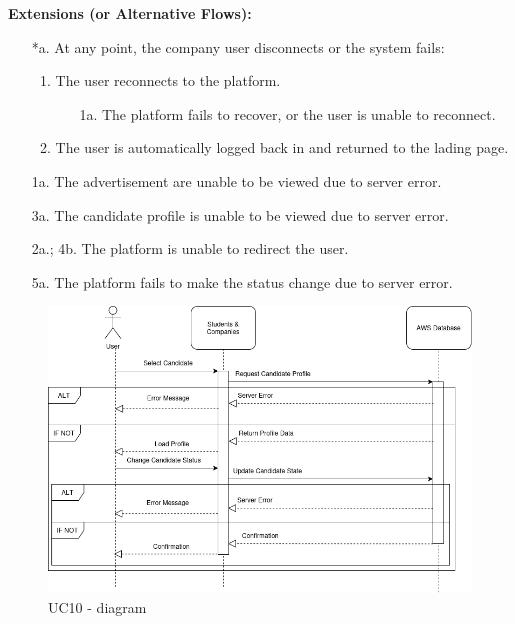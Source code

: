\begin{itemize}[label={[\textbf{UC}]}, align=left, leftmargin=*]
    \textbf{Extensions (or Alternative Flows):} 
    \begin{enumerate}[label=\arabic*.]
        \item[*a.] At any point, the company user disconnects or the system fails:
            \begin{enumerate}[label=\arabic*.]
                \item The user reconnects to the platform.
                    \begin{enumerate}[label=\alph*.]
                        \item[1a.] The platform fails to recover, or the user is unable to reconnect.
                    \end{enumerate}
                 \item The user is automatically logged back in and returned to the lading page.
            \end{enumerate}
        \item[1a.] The advertisement are unable to be viewed due to server error. 
        \item[3a.] The candidate profile is unable to be viewed due to server error. 
        \item[2a.; 4b.] The platform is unable to redirect the user.
        \item[5a.] The platform fails to make the status change due to server error.
        \end{enumerate}

    
     \begin{figure}[H]
    	\includegraphics[width=\textwidth,height=\textheight,keepaspectratio]{RASD-Latex/assets/Use Case Diagrams/UC10.png}
    	\caption{UC10 - diagram}
    	\label{fig:DataRequest}
    \end{figure}
    

\end{itemize}
